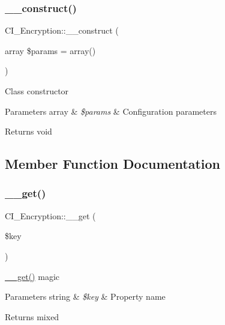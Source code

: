 \subsubsection{\texorpdfstring{\+\_\+\+\_\+construct()}{\_\_construct()}}
{\footnotesize\ttfamily C\+I\+\_\+\+Encryption\+::\+\_\+\+\_\+construct (\begin{DoxyParamCaption}\item[{array}]{\$params = {\ttfamily array()} }\end{DoxyParamCaption})}

Class constructor


\begin{DoxyParams}[1]{Parameters}
array & {\em \$params} & Configuration parameters \\
\hline
\end{DoxyParams}
\begin{DoxyReturn}{Returns}
void 
\end{DoxyReturn}


\subsection{Member Function Documentation}
\mbox{\label{class_c_i___encryption_a67e4421751deb8056d719747c51f7a88}} 
\subsubsection{\texorpdfstring{\+\_\+\+\_\+get()}{\_\_get()}}
{\footnotesize\ttfamily C\+I\+\_\+\+Encryption\+::\+\_\+\+\_\+get (\begin{DoxyParamCaption}\item[{}]{\$key }\end{DoxyParamCaption})}

\mbox{\hyperlink{class_c_i___encryption_a67e4421751deb8056d719747c51f7a88}{\+\_\+\+\_\+get()}} magic


\begin{DoxyParams}[1]{Parameters}
string & {\em \$key} & Property name \\
\hline
\end{DoxyParams}
\begin{DoxyReturn}{Returns}
mixed 
\end{DoxyReturn}
\mbox{\label{class_c_i___encryption_a6c02e8859c1b1cd409f528a013f60719}} 
